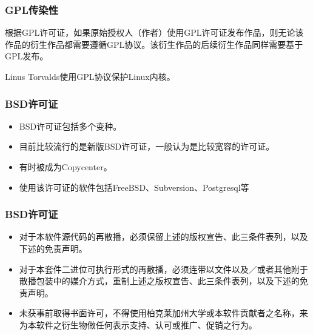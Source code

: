 \documentclass{beamer}
\begin{document}
\begin{frame}
  \frametitle{GPL传染性}
	根据GPL许可证，如果原始授权人（作者）使用GPL许可证发布作品，则无论该作品的衍生作品都需要遵循GPL协议。该衍生作品的后续衍生作品同样需要基于GPL发布。

	Linus Torvalds使用GPL协议保护Linux内核。
\end{frame}

\begin{frame}
  \frametitle{BSD许可证}
	\begin{itemize}
		\item BSD许可证包括多个变种。
		\item 目前比较流行的是新版BSD许可证，一般认为是比较宽容的许可证。
		\item 有时被成为Copycenter。
		\item 使用该许可证的软件包括FreeBSD、Subversion、Postgresql等
	\end{itemize}
\end{frame}

\begin{frame}
  \frametitle{BSD许可证}
	\begin{itemize}
		\item 对于本软件源代码的再散播，必须保留上述的版权宣告、此三条件表列，以及下述的免责声明。
		\item 对于本套件二进位可执行形式的再散播，必须连带以文件以及／或者其他附于散播包装中的媒介方式，重制上述之版权宣告、此三条件表列，以及下述的免责声明。
		\item 未获事前取得书面许可，不得使用柏克莱加州大学或本软件贡献者之名称，来为本软件之衍生物做任何表示支持、认可或推广、促销之行为。
	\end{itemize}
\end{frame}
\end{document}
